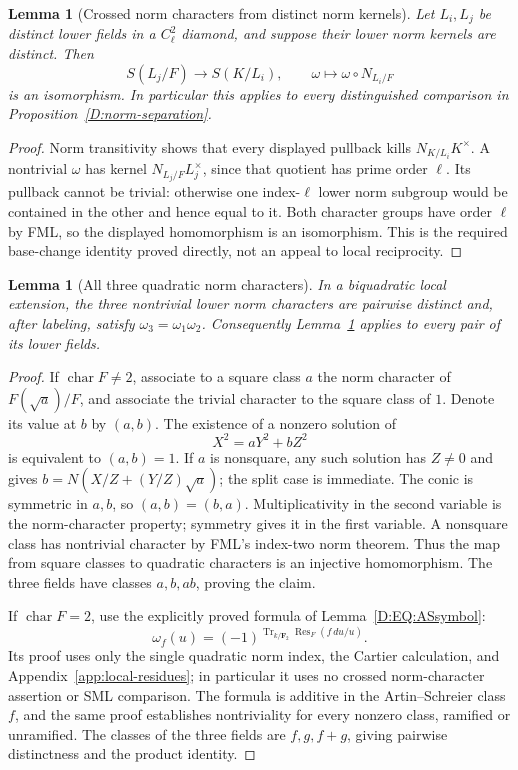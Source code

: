 \documentclass[11pt]{amsart}
\newtheorem{lemma}[theorem]{Lemma}
\theoremstyle{definition}
\theoremstyle{remark}
\newcommand{\F}{\mathbf F}
\newcommand{\Tr}{\operatorname{Tr}}
\begin{document}
\begin{lemma}[Crossed norm characters from distinct norm kernels]
\label{D:crossed-norm}
Let $L_i,L_j$ be distinct lower fields in a $C_\ell^2$ diamond, and
suppose their lower norm kernels are distinct. Then
\[
 S(L_j/F)\longrightarrow S(K/L_i),\qquad
       \omega\longmapsto\omega\circ N_{L_i/F}
\]
is an isomorphism. In particular this applies to every distinguished
comparison in Proposition~\ref{D:norm-separation}.
\end{lemma}
\begin{proof}
Norm transitivity shows that every displayed pullback kills
$N_{K/L_i}K^\times$. A nontrivial $\omega$ has kernel
$N_{L_j/F}L_j^\times$, since that quotient has prime order $\ell$.
Its pullback cannot be trivial: otherwise one index-$\ell$ lower norm
subgroup would be contained in the other and hence equal to it.
Both character groups have order $\ell$ by FML, so the displayed
homomorphism is an isomorphism. This is the required base-change
identity proved directly, not an appeal to local reciprocity.
\end{proof}

\begin{lemma}[All three quadratic norm characters]\label{D:quadratic-norms}
In a biquadratic local extension, the three nontrivial lower norm
characters are pairwise distinct and, after labeling, satisfy
$\omega_3=\omega_1\omega_2$. Consequently
Lemma~\ref{D:crossed-norm} applies to every pair of its lower fields.
\end{lemma}
\begin{proof}
If $\operatorname{char}F\ne2$, associate to a square class $a$ the
norm character of $F(\sqrt a)/F$, and associate the trivial character
to the square class of $1$. Denote its value at $b$ by $(a,b)$.
The existence of a nonzero solution of
\[
 X^2=aY^2+bZ^2
\]
is equivalent to $(a,b)=1$. If $a$ is nonsquare, any such solution
has $Z\ne0$ and gives $b=N(X/Z+(Y/Z)\sqrt a)$; the split case is
immediate. The conic is symmetric in $a,b$, so $(a,b)=(b,a)$.
Multiplicativity in the second variable is the norm-character
property; symmetry gives it in the first variable. A nonsquare class
has nontrivial character by FML's index-two norm theorem. Thus the
map from square classes to quadratic characters is an injective
homomorphism. The three fields have classes $a,b,ab$, proving the claim.

If $\operatorname{char}F=2$, use the explicitly proved formula
of Lemma~\ref{D:EQ:ASsymbol}:
\[
 \omega_f(u)=(-1)^{\Tr_{k/\F_2}\operatorname{Res}_F(f\,du/u)}.
\]
Its proof uses only the single quadratic norm index, the Cartier
calculation, and Appendix~\ref{app:local-residues}; in particular it
uses no crossed norm-character assertion or SML comparison.
The formula is additive in the Artin--Schreier class $f$, and the same
proof establishes nontriviality for every nonzero class, ramified or
unramified. The classes of the three fields are $f,g,f+g$, giving
pairwise distinctness and the product identity.
\end{proof}
\end{document}
